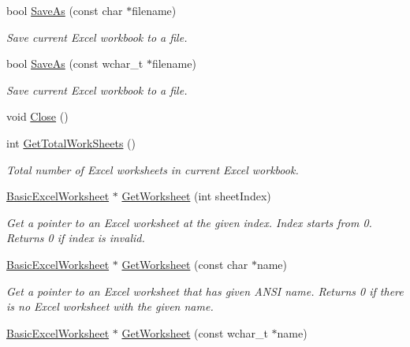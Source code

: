 \begin{DoxyCompactItemize}
bool \hyperlink{class_y_excel_1_1_basic_excel_aa74ad2c41158d036622cfd96c2adf586}{Save\+As} (const char $\ast$filename)
\begin{DoxyCompactList}\small\item\em Save current Excel workbook to a file. \end{DoxyCompactList}\item 
bool \hyperlink{class_y_excel_1_1_basic_excel_a5b6097ce4c4a07bf3f0cc9281d7b6ad2}{Save\+As} (const wchar\+\_\+t $\ast$filename)
\begin{DoxyCompactList}\small\item\em Save current Excel workbook to a file. \end{DoxyCompactList}\item 
void \hyperlink{class_y_excel_1_1_basic_excel_ae0ffc1f6832f34333714d515c4bc9ea9}{Close} ()
\item 
int \hyperlink{class_y_excel_1_1_basic_excel_ad9d06961e6c38fe49aafaf4b46950aee}{Get\+Total\+Work\+Sheets} ()
\begin{DoxyCompactList}\small\item\em Total number of Excel worksheets in current Excel workbook. \end{DoxyCompactList}\item 
\hyperlink{class_y_excel_1_1_basic_excel_worksheet}{Basic\+Excel\+Worksheet} $\ast$ \hyperlink{class_y_excel_1_1_basic_excel_a38836e5d918cd093456ab545f125e15c}{Get\+Worksheet} (int sheet\+Index)
\begin{DoxyCompactList}\small\item\em Get a pointer to an Excel worksheet at the given index. Index starts from 0. Returns 0 if index is invalid. \end{DoxyCompactList}\item 
\hyperlink{class_y_excel_1_1_basic_excel_worksheet}{Basic\+Excel\+Worksheet} $\ast$ \hyperlink{class_y_excel_1_1_basic_excel_aafa4420e83488dbb086d0ac2445671c1}{Get\+Worksheet} (const char $\ast$name)
\begin{DoxyCompactList}\small\item\em Get a pointer to an Excel worksheet that has given A\+N\+S\+I name. Returns 0 if there is no Excel worksheet with the given name. \end{DoxyCompactList}\item 
\hyperlink{class_y_excel_1_1_basic_excel_worksheet}{Basic\+Excel\+Worksheet} $\ast$ \hyperlink{class_y_excel_1_1_basic_excel_aaeff324debb122b5ebdab92c0c2b86c3}{Get\+Worksheet} (const wchar\+\_\+t $\ast$name)

\end{DoxyCompactItemize}
